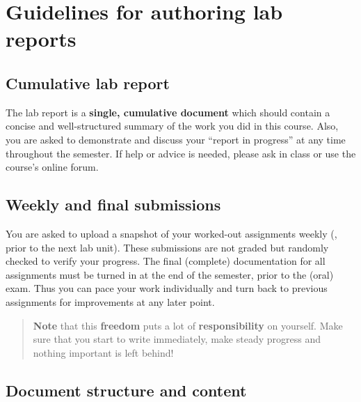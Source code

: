 \chapter*{Guidelines for authoring lab reports}

\section*{Cumulative lab report}

The lab report is a \textbf{single, cumulative document} which should contain 
a concise and well-structured summary of the work you did in this course.
Also, you are asked to demonstrate and discuss your ``report in progress'' at any time
throughout the semester.
If help or advice is needed, please ask in class or use the course's online forum.


\section*{Weekly and final submissions}

You are asked to upload a snapshot of your worked-out assignments weekly (\ie, prior to the next lab unit). 
These submissions are not graded but randomly checked to verify your progress.
The final (complete) documentation for all assignments must be turned in at 
the end of the semester, prior to the (oral) exam. 
Thus you can pace your work individually and turn back to previous assignments 
for improvements at any later point.
%
\begin{quote}
\textbf{Note} that this \textbf{freedom} puts a lot of \textbf{responsibility} on yourself. Make sure
that you start to write immediately, make steady progress and nothing important is left behind!
\end{quote}


\section*{Document structure and content}

